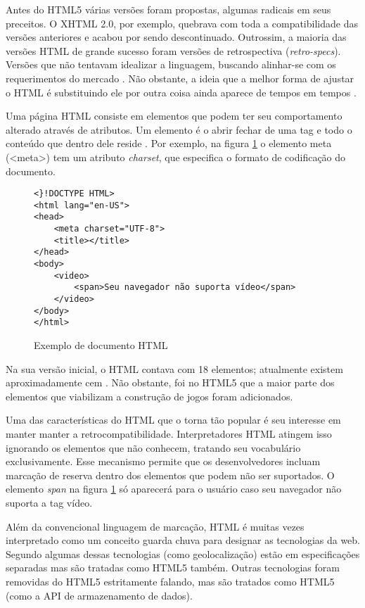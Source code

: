 Antes do HTML5 várias versões foram propostas, algumas radicais
em seus preceitos. O XHTML 2.0, por exemplo, quebrava com toda
a compatibilidade das versões anteriores e acabou por sendo descontinuado.
Outrossim, a maioria das versões HTML de grande sucesso foram versões de
retrospectiva (\textit{retro-specs}). Versões que não tentavam
idealizar a linguagem, buscando alinhar-se com os requerimentos do
mercado \autocite{diveIntohtml}. Não obstante, a ideia que a melhor forma
de ajustar o HTML é substituindo ele por outra coisa ainda aparece de tempos
em tempos \autocite{diveIntohtml}.

Uma página HTML consiste em elementos que podem ter seu comportamento
alterado através de atributos. Um elemento é o abrir fechar de
uma tag e todo o conteúdo que dentro dele reside \autocite[pp.
10--11]{htmlAndCssDucket}. Por exemplo, na figura \ref{fig:htmlSample} o elemento
meta (<meta>) tem um atributo \textit{charset}, que especifica o formato de 
codificação do documento.

\begin{figure}[H]
\centering
\begin{verbatim}
<}!DOCTYPE HTML>
<html lang="en-US">
<head>
	<meta charset="UTF-8">
	<title></title>
</head>
<body>
    <video>
        <span>Seu navegador não suporta vídeo</span>
    </video>
</body>
</html>
\end{verbatim}
\caption{Exemplo de documento HTML}
\label{fig:htmlSample}
\end{figure}

Na sua versão inicial, o HTML contava com 18 elementos; atualmente
existem aproximadamente cem \autocite{diveIntohtml}. Não obstante, foi
no HTML5 que a maior parte dos elementos que viabilizam a construção
de jogos foram adicionados.

Uma das características do HTML que o torna tão popular é seu
interesse em manter manter a retrocompatibilidade. Interpretadores
HTML atingem isso ignorando os elementos que não conhecem, tratando
seu vocabulário exclusivamente. Esse mecanismo permite que os
desenvolvedores incluam marcação de reserva dentro dos elementos
que podem não ser suportados. O elemento \textit{span} na figura
\ref{fig:htmlSample} só aparecerá para o usuário caso seu navegador
não suporta a tag vídeo.

Além da convencional linguagem de marcação, HTML é muitas vezes
interpretado como um conceito guarda chuva para designar as tecnologias
da web. Segundo \autocite{diveIntohtml} algumas dessas tecnologias (como geolocalização) estão em especificações separadas mas são tratadas como HTML5 também. Outras
tecnologias foram removidas do HTML5 estritamente falando, mas são tratados
como HTML5 (como a API de armazenamento de dados).

